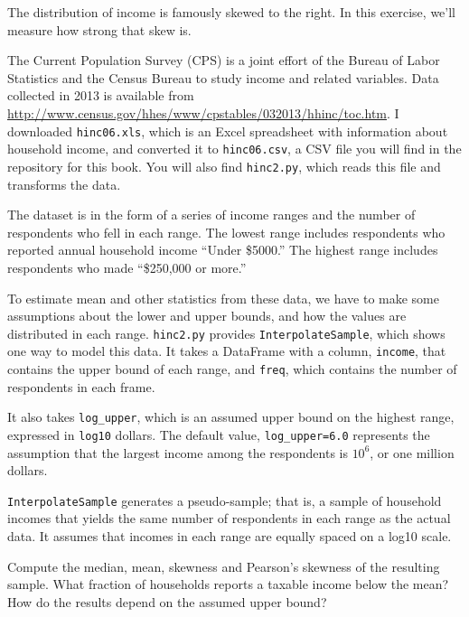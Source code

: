 \documentclass[12pt]{book}
\begin{document}
\begin{exercise}

The distribution of income is famously skewed to the right.  In this
exercise, we'll measure how strong that skew is.

The Current Population Survey (CPS) is a joint effort of the Bureau
of Labor Statistics and the Census Bureau to study income and related
variables.  Data collected in 2013 is available from
\url{http://www.census.gov/hhes/www/cpstables/032013/hhinc/toc.htm}.
I downloaded {\tt hinc06.xls}, which is an Excel spreadsheet with
information about household income, and converted it to {\tt hinc06.csv},
a CSV file you will find in the repository for this book.  You
will also find {\tt hinc2.py}, which reads this file and transforms
the data.

The dataset is in the form of a series of income ranges and the number
of respondents who fell in each range.  The lowest range includes
respondents who reported annual household income ``Under \$5000.''
The highest range includes respondents who made ``\$250,000 or
more.''

To estimate mean and other statistics from these data, we have to
make some assumptions about the lower and upper bounds, and how
the values are distributed in each range.  {\tt hinc2.py} provides
{\tt InterpolateSample}, which shows one way to model
this data.  It takes a DataFrame with a column, {\tt income}, that
contains the upper bound of each range, and {\tt freq}, which contains
the number of respondents in each frame.

It also takes \verb"log_upper", which is an assumed upper bound
on the highest range, expressed in {\tt log10} dollars.  
The default value, \verb"log_upper=6.0" represents the assumption
that the largest income among the respondents is
$10^6$, or one million dollars.

{\tt InterpolateSample} generates a pseudo-sample; that is, a sample
of household incomes that yields the same number of respondents
in each range as the actual data.  It assumes that incomes in
each range are equally spaced on a log10 scale.

Compute the median, mean, skewness and Pearson's skewness of the
resulting sample.  What fraction of households reports a taxable
income below the mean?  How do the results depend on the assumed
upper bound?
\end{exercise}
\end{document}
